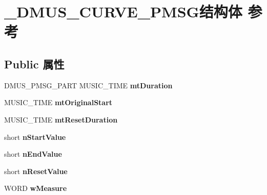 \hypertarget{struct___d_m_u_s___c_u_r_v_e___p_m_s_g}{}\section{\+\_\+\+D\+M\+U\+S\+\_\+\+C\+U\+R\+V\+E\+\_\+\+P\+M\+S\+G结构体 参考}
\label{struct___d_m_u_s___c_u_r_v_e___p_m_s_g}
\subsection*{Public 属性}
\begin{DoxyCompactItemize}
\item 
\mbox{\label{struct___d_m_u_s___c_u_r_v_e___p_m_s_g_aca362e290288b65d46a7428095e4fc03}} 
D\+M\+U\+S\+\_\+\+P\+M\+S\+G\+\_\+\+P\+A\+RT M\+U\+S\+I\+C\+\_\+\+T\+I\+ME {\bfseries mt\+Duration}
\item 
\mbox{\label{struct___d_m_u_s___c_u_r_v_e___p_m_s_g_a95c56a5ed267a4cb564b5e85d7a739f2}} 
M\+U\+S\+I\+C\+\_\+\+T\+I\+ME {\bfseries mt\+Original\+Start}
\item 
\mbox{\label{struct___d_m_u_s___c_u_r_v_e___p_m_s_g_aee0c28c2b464579dec3cfc6f9513ea24}} 
M\+U\+S\+I\+C\+\_\+\+T\+I\+ME {\bfseries mt\+Reset\+Duration}
\item 
\mbox{\label{struct___d_m_u_s___c_u_r_v_e___p_m_s_g_ae475fad3bbaea05d6d72e60de341841a}} 
short {\bfseries n\+Start\+Value}
\item 
\mbox{\label{struct___d_m_u_s___c_u_r_v_e___p_m_s_g_a085cff77e6704fe564ea7e76dfc1abfe}} 
short {\bfseries n\+End\+Value}
\item 
\mbox{\label{struct___d_m_u_s___c_u_r_v_e___p_m_s_g_a2918295eff301c5adac991d08b343e15}} 
short {\bfseries n\+Reset\+Value}
\item 
\mbox{\label{struct___d_m_u_s___c_u_r_v_e___p_m_s_g_aff388ee01ad8fc331830b11996d2fce1}} 
W\+O\+RD {\bfseries w\+Measure}

\end{DoxyCompactItemize}
